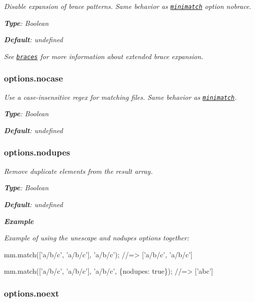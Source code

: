 {\itshape }

{\itshape Disable expansion of brace patterns. Same behavior as \href{https://github.com/isaacs/minimatch}{\tt minimatch} option {\ttfamily nobrace}.}

{\itshape {\bfseries Type}\+: {\ttfamily Boolean}}

{\itshape {\bfseries Default}\+: {\ttfamily undefined}}

{\itshape See \href{https://github.com/micromatch/braces}{\tt braces} for more information about extended brace expansion.}

{\itshape \subsubsection*{options.\+nocase}}

{\itshape }

{\itshape Use a case-\/insensitive regex for matching files. Same behavior as \href{https://github.com/isaacs/minimatch}{\tt minimatch}.}

{\itshape {\bfseries Type}\+: {\ttfamily Boolean}}

{\itshape {\bfseries Default}\+: {\ttfamily undefined}}

{\itshape \subsubsection*{options.\+nodupes}}

{\itshape }

{\itshape Remove duplicate elements from the result array.}

{\itshape {\bfseries Type}\+: {\ttfamily Boolean}}

{\itshape {\bfseries Default}\+: {\ttfamily undefined}}

{\itshape {\bfseries Example}}

{\itshape Example of using the {\ttfamily unescape} and {\ttfamily nodupes} options together\+:}

{\itshape 
\begin{DoxyCode}
mm.match(['a/b/c', 'a/b/c'], 'a/b/c');
//=> ['a/b/c', 'a/b/c']

mm.match(['a/b/c', 'a/b/c'], 'a/b/c', \{nodupes: true\});
//=> ['abc']
\end{DoxyCode}
}

{\itshape \subsubsection*{options.\+noext}}

